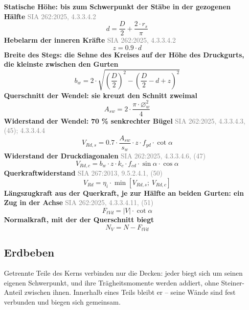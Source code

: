 \documentclass[11pt,a4paper]{article}
\newcommand{\normref}[1]{{\small\textcolor{gray}{#1}}}
\begin{document}
\noindent\textbf{Statische Höhe: bis zum Schwerpunkt der Stäbe in der gezogenen Hälfte} \hfill \normref{SIA 262:2025, 4.3.3.4.2}
\begin{equation*}
d = \frac{D}{2} + \frac{2 \cdot r_s}{\pi}
\end{equation*}
\noindent\textbf{Hebelarm der inneren Kräfte} \hfill \normref{SIA 262:2025, 4.3.3.4.2}
\begin{equation*}
z = 0.9 \cdot d
\end{equation*}
\noindent\textbf{Breite des Stegs: die Sehne des Kreises auf der Höhe des Druckgurts, die kleinste zwischen den Gurten}
\begin{equation*}
b_w = 2 \cdot \sqrt{\left(\frac{D}{2}\right)^{2} - \left(\frac{D}{2} - d + z\right)^{2}}
\end{equation*}
\noindent\textbf{Querschnitt der Wendel: sie kreuzt den Schnitt zweimal}
\begin{equation*}
A_{sw} = 2 \cdot \frac{\pi \cdot \varnothing_w^{2}}{4}
\end{equation*}
\noindent\textbf{Widerstand der Wendel: 70 \% senkrechter Bügel} \hfill \normref{SIA 262:2025, 4.3.3.4.3, (45); 4.3.3.4.4}
\begin{equation*}
V_{Rd,s} = 0.7 \cdot \frac{A_{sw}}{s_w} \cdot z \cdot f_{yd} \cdot \cot \alpha
\end{equation*}
\noindent\textbf{Widerstand der Druckdiagonalen} \hfill \normref{SIA 262:2025, 4.3.3.4.6, (47)}
\begin{equation*}
V_{Rd,c} = b_w \cdot z \cdot k_c \cdot f_{cd} \cdot \sin \alpha \cdot \cos \alpha
\end{equation*}
\noindent\textbf{Querkraftwiderstand} \hfill \normref{SIA 267:2013, 9.5.2.4.1, (50)}
\begin{equation*}
V_{Rd} = \eta_i \cdot \min\left[V_{Rd,s};\ V_{Rd,c}\right]
\end{equation*}
\noindent\textbf{Längszugkraft aus der Querkraft, je zur Hälfte an beiden Gurten: ein Zug in der Achse} \hfill \normref{SIA 262:2025, 4.3.3.4.11, (51)}
\begin{equation*}
F_{tVd} = \left|V\right| \cdot \cot \alpha
\end{equation*}
\noindent\textbf{Normalkraft, mit der der Querschnitt biegt}
\begin{equation*}
N_V = N - F_{tVd}
\end{equation*}
\subsection{Erdbeben}
Getrennte Teile des Kerns verbinden nur die Decken: jeder biegt sich um seinen eigenen Schwerpunkt, und ihre Trägheitsmomente werden addiert, ohne Steiner-Anteil zwischen ihnen. Innerhalb eines Teils bleibt er – seine Wände sind fest verbunden und biegen sich gemeinsam.
\end{document}
